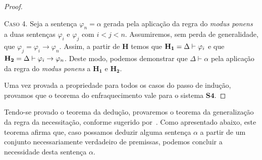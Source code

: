 \begin{theorem}[Enfraquecimento]
\begin{proof}
            \begin{case}
                \textsc{Caso 4.} Seja a sentença $\varphi_n=\alpha$ gerada pela aplicação da regra do \emph{modus ponens} a duas sentenças $\varphi_i$ e $\varphi_j$ com $i<j<n$. Assumiremos, sem perda de generalidade, que $\varphi_j=\varphi_i\to\varphi_n$.
                Assim, a partir de $\mathbf{H}$ temos que $\mathbf{H_1}=\Delta\mathrel{\vdash}\varphi_i$ e que $\mathbf{H_2}=\Delta\mathrel{\vdash}\varphi_i\to\varphi_n$.
                Deste modo, podemos demonstrar que $\Delta\vdash\alpha$ pela aplicação da regra do \emph{modus ponens} a $\mathbf{H_1}$ e $\mathbf{H_2}$.
            \end{case}
            Uma vez provada a propriedade para todos os casos do passo de indução, provamos que o teorema do enfraquecimento vale para o sistema $\mathbf{S4}$.
        \end{proof}
    \end{theorem}

    Tendo-se provado o teorema da dedução, provaremos o teorema da generalização da regra da necessitação, conforme sugerido por~\cite{Troelstra}.
    Como apresentado abaixo, este teorema afirma que, caso possamos deduzir alguma sentença $\alpha$ a partir de um conjunto necessariamente verdadeiro de premissas, podemos concluir a necessidade desta sentença $\alpha$.

